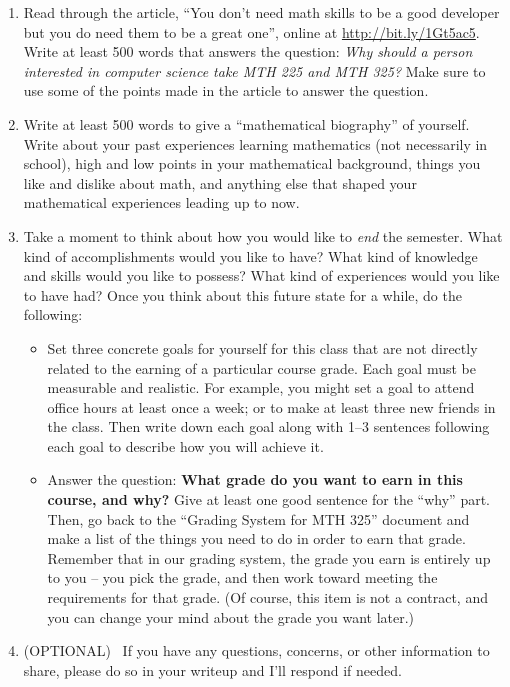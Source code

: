 \documentclass[11pt,letterpaper]{article}
\begin{document}
\begin{enumerate}
	\item Read through the article, ``You don't need math skills to be a good developer but you do need them to be a great one'', online at \url{http://bit.ly/1Gt5ac5}. Write at least 500 words that answers the question: \emph{Why should a person interested in computer science take MTH 225 and MTH 325?} Make sure to use some of the points made in the article to answer the question. 

	\item Write at least 500 words to give a ``mathematical biography'' of yourself. Write about your past experiences learning mathematics (not necessarily in school), high and low points in your mathematical background, things you like and dislike about math, and anything else that shaped your mathematical experiences leading up to now. 

	\item Take a moment to think about how you would like to \emph{end} the semester. What kind of accomplishments would you like to have? What kind of knowledge and skills would you like to possess? What kind of experiences would you like to have had? Once you think about this future state for a while, do the following: 
		\begin{itemize}
			\item Set three concrete goals for yourself for this class that are not directly related to the earning of a particular course grade. Each goal must be measurable and realistic. For example, you might set a goal to attend office hours at least once a week; or to make at least three new friends in the class. Then write down each goal along with 1--3 sentences following each goal to describe how you will achieve it. 
			\item Answer the question: \textbf{What grade do you want to earn in this course, and why?} Give at least one good sentence for the ``why'' part. Then, go back to the ``Grading System for MTH 325'' document and make a list of the things you need to do in order to earn that grade. Remember that in our grading system, the grade you earn is entirely up to you -- you pick the grade, and then work toward meeting the requirements for that grade. (Of course, this item is not a contract, and you can change your mind about the grade you want later.) 
		\end{itemize}

	\item (OPTIONAL) \ If you have any questions, concerns, or other information to share, please do so in your writeup and I'll respond if needed. 

\end{enumerate}
\end{document}
